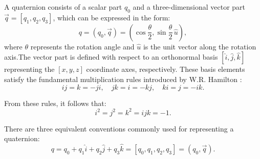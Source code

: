 A quaternion consists of a scalar part $q_0$ and a three-dimensional vector part $\vec{q} = [q_1, q_2, q_3]$, which can be expressed in the form:
\begin{equation}
q = (q_0, \vec{q}) = \left( \cos\frac{\theta}{2}, \sin\frac{\theta}{2} \, \hat{u} \right),
\label{eqn:quaternion_form}
\end{equation}
where $\theta$ represents the rotation angle and $\hat{u}$ is the unit vector along the rotation axis.The vector part is defined with respect to an orthonormal basis $[\hat{i}, \hat{j}, \hat{k}]$ representing the $[x, y, z]$ coordinate axes, respectively. These basis elements satisfy the fundamental multiplication rules introduced by W.R. Hamilton \cite{hamilton1866elements}:
\begin{equation}
ij = k = -ji, \quad jk = i = -kj, \quad ki = j = -ik.
\label{eqn:hamilton_rules}
\end{equation}

From these rules, it follows that:
\begin{equation}
i^2 = j^2 = k^2 = ijk = -1.
\label{eqn:quaternion_squares}
\end{equation}

There are three equivalent conventions commonly used for representing a quaternion:
\begin{equation}
q = q_0 + q_1 \hat{i} + q_2 \hat{j} + q_3 \hat{k} = [q_0, q_1, q_2, q_3] = (q_0, \vec{q}).
\label{eqn:quaternion_representations}
\end{equation}







